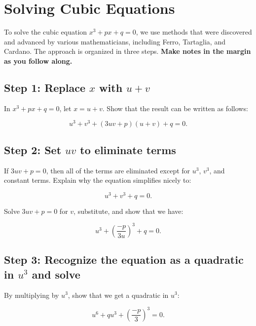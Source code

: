 \newpage
\section{Solving Cubic Equations}\label{A:solvingCubics}

To solve the cubic equation $x^3+px+q=0$, we use methods that were discovered and advanced by various mathematicians, including Ferro, Tartaglia, and Cardano.  The approach is organized in three steps.  \textbf{Make notes in the margin as you follow along.}  


\subsection{Step 1:  Replace $x$ with $u+v$}
In $x^3+px+q=0$, let $x = u + v$.  %
Show that the result can be written as follows:  

$$u^3+v^3+(3uv+p)(u+v)+q = 0.$$

\subsection{Step 2: Set $uv$ to eliminate terms}
If $3uv+p=0$, then all of the terms are eliminated except for $u^3$, $v^3$, and constant terms. Explain why the equation simplifies nicely to:

$$u^3+v^3 + q = 0.$$

Solve $3uv+p=0$ for $v$, substitute, and show that we have:  

$$u^3+\left( \frac{-p}{3u}\right)^3+q=0.$$

\subsection{Step 3:  Recognize the equation as a quadratic in $u^3$ and solve}

By multiplying by $u^3$, show that we get a quadratic in $u^3$:   

$$u^6+qu^3+\left( \frac{-p}{3}\right)^3 = 0.$$


